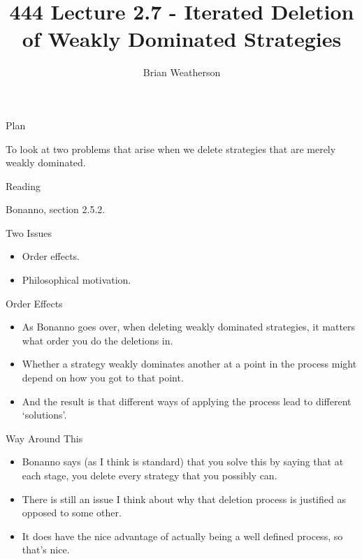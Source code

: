 \documentclass[
  ignorenonframetext,
]{beamer}
\title{444 Lecture 2.7 - Iterated Deletion of Weakly Dominated Strategies}
\author{Brian Weatherson}
\date{}
\providecommand{\tightlist}{%
  \setlength{\itemsep}{0pt}\setlength{\parskip}{0pt}}
\begin{document}
\frame{\titlepage}

\begin{frame}{Plan}
\protect\hypertarget{plan}{}

To look at two problems that arise when we delete strategies that are
merely weakly dominated.

\end{frame}

\begin{frame}{Reading}
\protect\hypertarget{reading}{}

Bonanno, section 2.5.2.

\end{frame}

\begin{frame}{Two Issues}
\protect\hypertarget{two-issues}{}

\begin{itemize}
\tightlist
\item
  Order effects.
\item
  Philosophical motivation.
\end{itemize}

\end{frame}

\begin{frame}{Order Effects}
\protect\hypertarget{order-effects}{}

\begin{itemize}
\tightlist
\item
  As Bonanno goes over, when deleting weakly dominated strategies, it
  matters what order you do the deletions in.
\item
  Whether a strategy weakly dominates another at a point in the process
  might depend on how you got to that point.
\item
  And the result is that different ways of applying the process lead to
  different `solutions'.
\end{itemize}

\end{frame}

\begin{frame}{Way Around This}
\protect\hypertarget{way-around-this}{}

\begin{itemize}
\tightlist
\item
  Bonanno says (as I think is standard) that you solve this by saying
  that at each stage, you delete every strategy that you possibly can.
\item
  There is still an issue I think about why that deletion process is
  justified as opposed to some other.
\item
  It does have the nice advantage of actually being a well defined
  process, so that's nice.
\end{itemize}

\end{frame}
\end{document}
